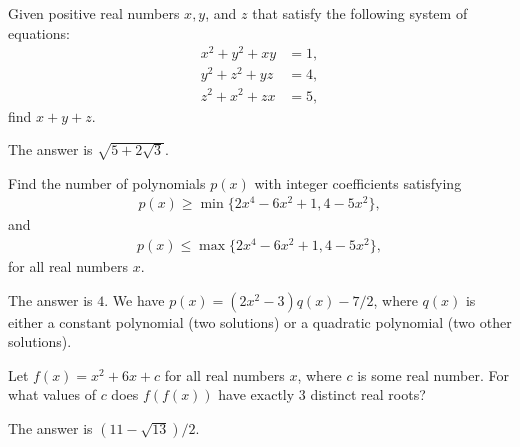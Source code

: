 \begin{question}[name={2011 HMMT, Guts, Problem 17}]
	Given positive real numbers $x,y$, and $z$ that satisfy the following system of equations:
	\begin{align*}
		x^2+y^2+xy&=1,\\
		y^2+z^2+yz&=4,\\
		z^2+x^2+zx&=5,
	\end{align*}
	find $x+y+z$.
\end{question}

\begin{solution}
	The answer is $\boxed{\sqrt{5+2\sqrt{3}}}$.
\end{solution}







\begin{question}[name={2011 HMMT, Guts, Problem 27}]
	Find the number of polynomials $p(x)$ with integer coefficients satisfying
	\begin{align*}
		p(x) \geq \min\{2x^4-6x^2+1,4-5x^2\},
	\end{align*}
	and
	\begin{align*}
		p(x) \leq \max\{2x^4-6x^2+1,4-5x^2\},
	\end{align*}
	for all real numbers $x$.
\end{question}

\begin{solution}
	The answer is $\boxed{4}$. We have $p(x)=(2x^2-3)q(x)-7/2$, where $q(x)$ is either a constant polynomial (two solutions) or a quadratic polynomial (two other solutions).  
\end{solution}





\begin{question}[name={2011 HMMT, Algebra \& Geometry, Problem 27}]
	Let $f(x) = x^2 + 6x + c$ for all real numbers $x$, where $c$ is some real number. For what values of $c$ does
	$f(f(x))$ have exactly $3$ distinct real roots?
\end{question}

\begin{solution}
	The answer is $\boxed{(11-\sqrt{13})/{2}}$.
\end{solution}















